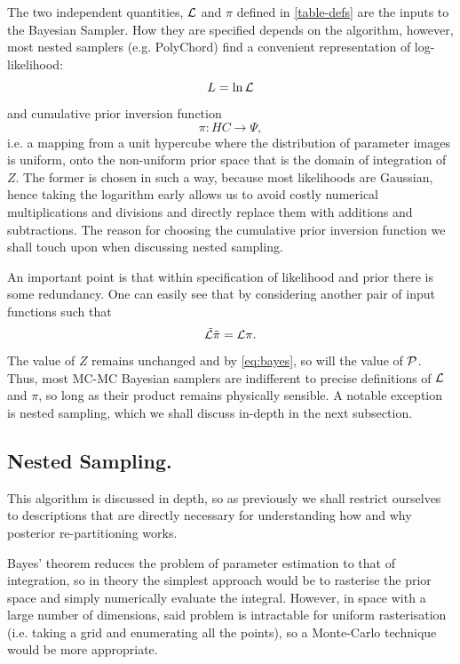 \documentclass[usenatbib]{mnras}
\begin{document}
The two independent quantities, \({\cal L}\) and \(\pi\) defined in \autoref{table-defs} are the
inputs to the Bayesian Sampler. How they are specified depends on the algorithm, however, most nested samplers (e.g. PolyChord) find a convenient representation of log-likelihood: 
\begin{equation}
  L = \ln \cal L
\end{equation}
and cumulative prior inversion function 
\begin{equation}
 \pi : HC \rightarrow \Psi,
\end{equation}
i.e. a mapping from a unit hypercube where the distribution of
parameter images is uniform, onto the non-uniform prior space that
is the domain of integration of \(Z\). The former is chosen in such
a way, because most likelihoods are Gaussian, hence taking the
logarithm early allows us to avoid costly numerical multiplications
and divisions and directly replace them with additions and
subtractions. The reason for choosing the cumulative prior inversion function
we shall touch upon when discussing nested sampling.

An important point is that within specification of likelihood and
prior there is some redundancy. One can easily see that by
considering another pair of input functions such that 
\begin{equation}
  \tilde{\cal L} \tilde{\pi} = \cal L \pi. 
\end{equation}
The value of \(Z\) remains unchanged and by \autoref{eq:bayes}, so
will the value of \(\cal P\). Thus, most MC-MC Bayesian samplers
are indifferent to precise definitions of \(\cal L\) and \(\pi\),
so long as their product remains physically sensible. A notable
exception is nested sampling, which we shall discuss in-depth in
the next subsection.

\subsection{Nested Sampling.}
\label{sec:org1782fc3}

This algorithm is discussed in depth, so as previously we shall
restrict ourselves to descriptions that are directly necessary for
understanding how and why posterior re-partitioning works.

Bayes' theorem reduces the problem of parameter estimation to that
of integration, so in theory the simplest approach would be to
rasterise the prior space and simply numerically evaluate the
integral. However, in space with a large number of dimensions, said
problem is intractable for uniform rasterisation (i.e. taking a
grid and enumerating all the points), so a Monte-Carlo technique
would be more appropriate.
\end{document}
